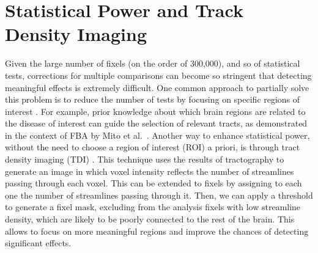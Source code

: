 \section{Statistical Power and Track Density Imaging}
Given the large number of fixels (on the order of 300,000), and so of statistical tests, corrections for multiple comparisons can become so stringent that detecting meaningful effects is extremely difficult. 
One common approach to partially solve this problem is to reduce the number of tests by focusing on specific regions of interest \cite{Cremers2017, Lindquist2015}. 
For example, prior knowledge about which brain regions are related to the disease of interest can guide the selection of relevant tracts, as demonstrated in the context of FBA by Mito et al.\ \cite{Mito2018}.
Another way to enhance statistical power, without the need to choose a region of interest (ROI) a priori, is through tract density imaging (TDI) \cite{Calamante2010}. This technique uses the results of tractography to generate an image in which voxel intensity reflects the number of streamlines passing through each voxel. This can be extended to fixels by assigning to each one the number of streamlines passing through it. Then, we can apply a threshold to generate a fixel mask, excluding from the analysis fixels with low streamline density, which are likely to be poorly connected to the rest of the brain. This allows to focus on more meaningful regions and improve the chances of detecting significant effects.